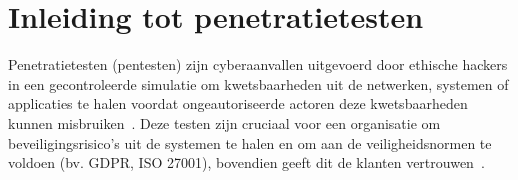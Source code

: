 



\section{Inleiding tot penetratietesten}
Penetratietesten (pentesten) zijn cyberaanvallen uitgevoerd door ethische hackers in een gecontroleerde simulatie om kwetsbaarheden uit de netwerken, systemen of applicaties te halen voordat ongeautoriseerde actoren deze kwetsbaarheden kunnen misbruiken~\autocite{Bindlish2021}. 
Deze testen zijn cruciaal voor een organisatie om beveiligingsrisico's uit de systemen te halen en om aan de veiligheidsnormen te voldoen (bv. GDPR, ISO 27001), bovendien geeft dit de klanten vertrouwen~\autocite{Dalalana2017}.

